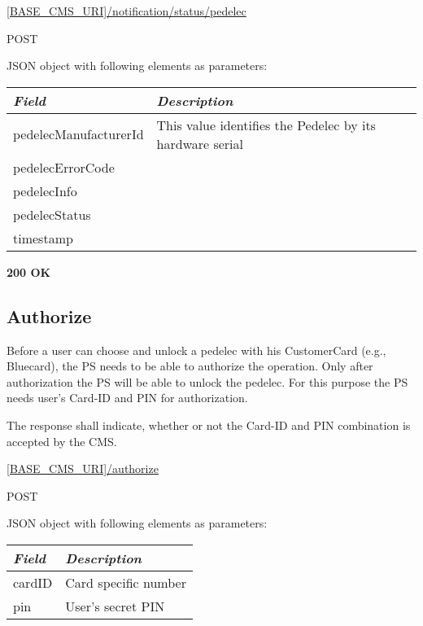  \url{[BASE_CMS_URI]/notification/status/pedelec}

 POST

JSON object with following elements as parameters:\\
\begin{tabularx}{\linewidth}{ | l | X | }
  \hline
  \textit{Field} & \textit{Description} \\
  \hline \hline
  pedelecManufacturerId 		& This value identifies the Pedelec by its hardware serial\\
  pedelecErrorCode & \\
  pedelecInfo & \\
  pedelecStatus & \\
  timestamp & \\
  
    \hline
\end{tabularx}

\textbf{200 OK}\\


\subsection{Authorize}

Before a user can choose and unlock a pedelec with his CustomerCard (e.g., Bluecard), the \acs{PS} needs to be able to authorize the operation. Only after authorization the \acs{PS} will be able to unlock the pedelec. For this purpose the \acs{PS} needs user's Card-ID and PIN for authorization.

The response shall indicate, whether or not the Card-ID and PIN combination is accepted by the \acs{CMS}.

 \url{[BASE_CMS_URI]/authorize}

 POST

JSON object with following elements as parameters:\\
\begin{tabularx}{\linewidth}{ | l | X | }
  \hline
  \textit{Field} & \textit{Description} \\
  \hline \hline
  	cardID 		& Card specific number\\
  	pin			& User's secret PIN \\
    \hline
\end{tabularx}

